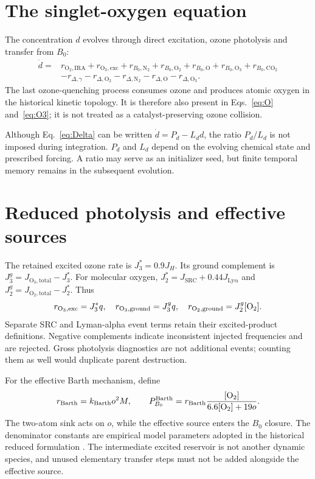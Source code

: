 \section{The singlet-oxygen equation}
The concentration $d$ evolves through direct excitation, ozone photolysis and transfer from $B_0$:
\begin{align}
\dot d={}&r_{\mathrm{O_2,IRA}}+r_{\mathrm{O_3,exc}}
+r_{B_0,\mathrm{N_2}}+r_{B_0,\mathrm{O_2}}+r_{B_0,\mathrm{O}}
+r_{B_0,\mathrm{O_3}}+r_{B_0,\mathrm{CO_2}}\nonumber\\
&-r_{\Delta,\gamma}-r_{\Delta,\mathrm{O_2}}-r_{\Delta,\mathrm{N_2}}
-r_{\Delta,\mathrm{O}}-r_{\Delta,\mathrm{O_3}}.
\label{eq:Delta}
\end{align}
The last ozone-quenching process consumes ozone and produces atomic oxygen in the historical kinetic topology. It is therefore also present in Eqs.~\eqref{eq:O} and~\eqref{eq:O3}; it is not treated as a catalyst-preserving ozone collision.

Although Eq.~\eqref{eq:Delta} can be written $\dot d=P_d-L_dd$, the ratio $P_d/L_d$ is not imposed during integration. $P_d$ and $L_d$ depend on the evolving chemical state and prescribed forcing. A ratio may serve as an initializer seed, but finite temporal memory remains in the subsequent evolution.

\section{Reduced photolysis and effective sources}
The retained excited ozone rate is $J_3^*=0.9J_H$. Its ground complement is $J_3^g=J_{\mathrm{O_3,total}}-J_3^*$. For molecular oxygen, $J_2^*=J_{\mathrm{SRC}}+0.44J_{\mathrm{Ly\alpha}}$ and $J_2^g=J_{\mathrm{O_2,total}}-J_2^*$. Thus
\begin{equation}r_{\mathrm{O_3,exc}}=J_3^*q,\quad r_{\mathrm{O_3,ground}}=J_3^gq,
\quad r_{\mathrm{O_2,ground}}=J_2^g[\mathrm{O}_2].\label{eq:partition}\end{equation}
Separate SRC and Lyman-alpha event terms retain their excited-product definitions. Negative complements indicate inconsistent injected frequencies and are rejected. Gross photolysis diagnostics are not additional events; counting them as well would duplicate parent destruction.

For the effective Barth mechanism, define
\begin{equation}r_{\mathrm{Barth}}=k_{\mathrm{Barth}}o^2M,\qquad
P_{B_0}^{\mathrm{Barth}}=r_{\mathrm{Barth}}
\frac{[\mathrm{O}_2]}{6.6[\mathrm{O}_2]+19o}.\label{eq:barth}\end{equation}
The two-atom sink acts on $o$, while the effective source enters the $B_0$ closure. The denominator constants are empirical model parameters adopted in the historical reduced formulation \citep{li2020}. The intermediate excited reservoir is not another dynamic species, and unused elementary transfer steps must not be added alongside the effective source.

